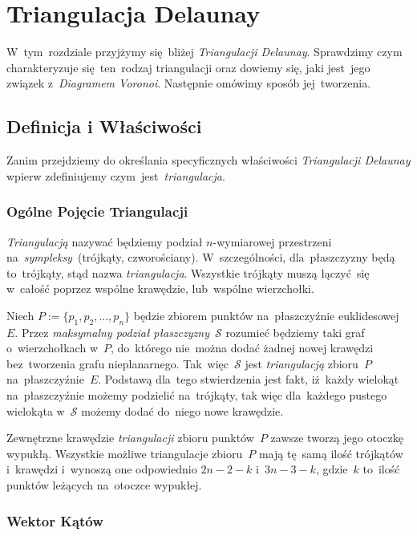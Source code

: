\documentclass[skorowidz,autorrok,backref,xodstep,oswiadczenie]{wmimgr}
\begin{document}
\chapter{Triangulacja Delaunay}

W~tym~rozdziale przyjżymy się~bliżej \emph{Triangulacji Delaunay}. Sprawdzimy czym charakteryzuje się~ten~rodzaj triangulacji oraz dowiemy się, jaki jest~jego związek z~\emph{Diagramem Voronoi}. Następnie omówimy sposób jej~tworzenia.

\section{Definicja i Właściwości}

Zanim przejdziemy do określania specyficznych właściwości \emph{Triangulacji Delaunay} wpierw zdefiniujemy czym~jest~\emph{triangulacja}.

\subsection{Ogólne Pojęcie Triangulacji}

\emph{Triangulacją} nazywać będziemy podział $n$-wymiarowej przestrzeni na~\emph{sympleksy}~(trójkąty, czworościany). W~szczególności, dla~płaszczyzny będą to~trójkąty, stąd nazwa \emph{triangulacja}. Wszystkie trójkąty muszą łączyć~się w~całość poprzez wspólne krawędzie, lub~wspólne wierzchołki.

Niech $P:=\{ p_{1},p_{2},...,p_{n} \}$ będzie zbiorem punktów na~płaszczyźnie euklidesowej $E$. Przez \emph{maksymalny podział płaszczyzny}~$\mathcal{S}$ rozumieć będziemy taki graf o~wierzchołkach w~$P$, do~którego nie~można dodać żadnej nowej krawędzi bez~tworzenia grafu nieplanarnego. Tak~więc~$\mathcal{S}$ jest \emph{triangulacją} zbioru~$P$ na~płaszczyźnie~$E$. Podstawą dla~tego stwierdzenia jest fakt, iż~każdy wielokąt na~płaszczyźnie możemy podzielić na~trójkąty\cite{geometria}, tak więc dla~każdego pustego wielokąta w~$\mathcal{S}$ możemy dodać do~niego nowe krawędzie.

Zewnętrzne krawędzie \emph{triangulacji} zbioru punktów~$P$ zawsze tworzą jego otoczkę wypukłą. Wszystkie możliwe triangulacje zbioru~$P$ mają tę~samą ilość trójkątów i~krawędzi i~wynoszą one odpowiednio $2n-2-k$ i~$3n-3-k$, gdzie~$k$ to~ilość punktów leżących na~otoczce wypukłej.

\subsection{Wektor Kątów}
\end{document}
